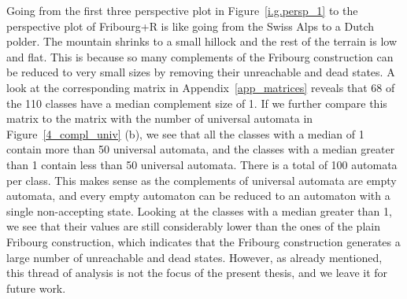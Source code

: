 Going from the first three perspective plot in Figure~\ref{i.g.persp_1} to the perspective plot of Fribourg+R is like going from the Swiss Alps to a Dutch polder. The mountain shrinks to a small hillock and the rest of the terrain is low and flat. This is because so many complements of the Fribourg construction can be reduced to very small sizes by removing their unreachable and dead states. A look at the corresponding matrix in Appendix~\ref{app_matrices} reveals that 68 of the 110 classes have a median complement size of 1. If we further compare this matrix to the matrix with the number of universal automata in Figure~\ref{4_compl_univ} (b), we see that all the classes with a median of 1 contain more than 50 universal automata, and the classes with a median greater than 1 contain less than 50 universal automata. There is a total of 100 automata per class. This makes sense as the complements of universal automata are empty automata, and every empty automaton can be reduced to an automaton with a single non-accepting state. Looking at the classes with a median greater than 1, we see that their values are still considerably lower than the ones of the plain Fribourg construction, which indicates that the Fribourg construction generates a large number of unreachable and dead states. However, as already mentioned, this thread of analysis is not the focus of the present thesis, and we leave it for future work.

